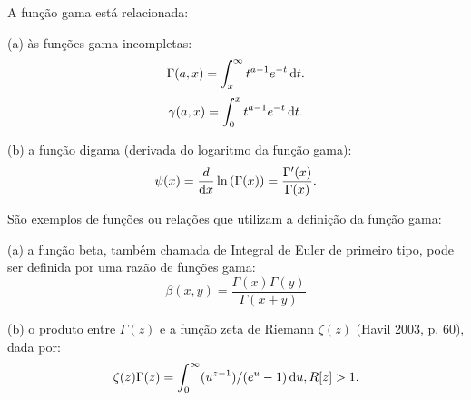 A função gama está relacionada:

(a) às funções gama incompletas:
$$\Gamma(a,x) = \displaystyle \int_{x}^{\infty} t^{{a-1}} e^{-t}\operatorname{d}\!t.$$
$$\gamma(a,x) = \displaystyle \int_{0}^{x} t^{a-1} e^{-t}\operatorname{d}\!t.$$

(b) a função digama (derivada do logaritmo da função gama):
$$\psi(x)=\displaystyle \frac{d}{\operatorname{d}\!x}\operatorname{ln}\left(\Gamma(x)\right) = \displaystyle \frac{\Gamma'(x)}{\Gamma(x)}.$$

São exemplos de funções ou relações que utilizam a definição da função gama:

(a) a função beta, também chamada de Integral de Euler de primeiro tipo, pode ser definida por uma razão de funções gama:
$$\beta(x,y) = \dfrac{\Gamma(x)\Gamma(y)}{\Gamma(x+y)}$$

(b) o produto entre $\Gamma(z)$ e a função zeta de Riemann $\zeta(z)$ (Havil 2003, p. 60), dada por:
$$\zeta(z)\Gamma(z)=\displaystyle \int_{0}^{\infty} (u^{z-1})/(e^u-1)\operatorname{d}\!u, R[z]>1.$$


%
%
%
%
%



